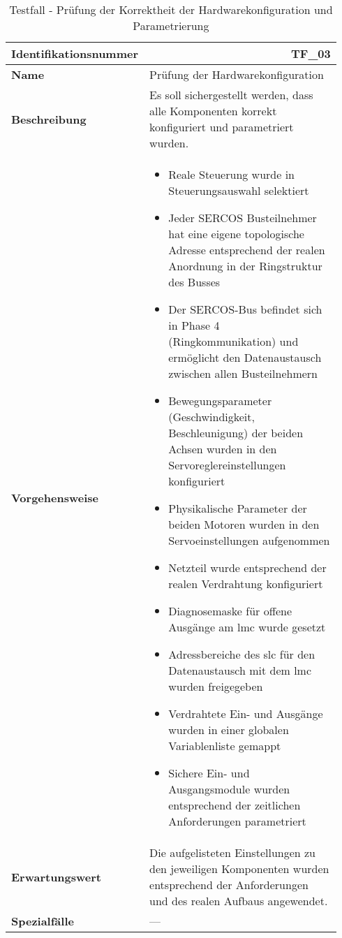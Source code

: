 \documentclass[../../../Bachelorarbeit.tex]{subfiles}
\begin{document}
\begin{table}[H]
    \centering
    \begin{tabular}{ p{0.34\linewidth}  p{0.6\linewidth} }
        \hline
        \textbf{Identifikationsnummer}  & \multicolumn{1}{r}{TF\_03} \\ \hline
        \textbf{Name}                   & Prüfung der Hardwarekonfiguration \\
        \textbf{Beschreibung}           & Es soll sichergestellt werden, dass alle Komponenten korrekt konfiguriert und parametriert wurden. \\
        \textbf{Vorgehensweise}         &   {\begin{itemize}[noitemsep,topsep=0pt,parsep=0pt,partopsep=0pt,leftmargin=*]
                                                \item Reale Steuerung wurde in Steuerungsauswahl selektiert
                                                \item Jeder SERCOS Busteilnehmer hat eine eigene topologische Adresse entsprechend der realen Anordnung in der Ringstruktur des Busses
                                                \item Der SERCOS-Bus befindet sich in Phase 4 (Ringkommunikation) und ermöglicht den Datenaustausch zwischen allen Busteilnehmern
                                                \item Bewegungsparameter (Geschwindigkeit, Beschleunigung) der beiden Achsen wurden in den Servoreglereinstellungen konfiguriert
                                                \item Physikalische Parameter der beiden Motoren wurden in den Servoeinstellungen aufgenommen
                                                \item Netzteil wurde entsprechend der realen Verdrahtung konfiguriert
                                                \item Diagnosemaske für offene Ausgänge am \acs{lmc} wurde gesetzt
                                                \item Adressbereiche des \acs{slc} für den Datenaustausch mit dem \acs{lmc} wurden freigegeben
                                                \item Verdrahtete Ein- und Ausgänge wurden in einer globalen Variablenliste gemappt
                                                \item Sichere Ein- und Ausgangsmodule wurden entsprechend der zeitlichen Anforderungen parametriert
                                            \end{itemize}} \\
        \textbf{Erwartungswert}         & Die aufgelisteten Einstellungen zu den jeweiligen Komponenten wurden entsprechend der Anforderungen und des realen Aufbaus angewendet. \\
        \textbf{Spezialfälle}           & --- \\ \hline
    \end{tabular}
    \caption[\acs{tf} - Hardwarekonfigurationsprüfung]{Testfall - Prüfung der Korrektheit der Hardwarekonfiguration und Parametrierung}
    \label{tab:my-table62}
\end{table}
\end{document}

